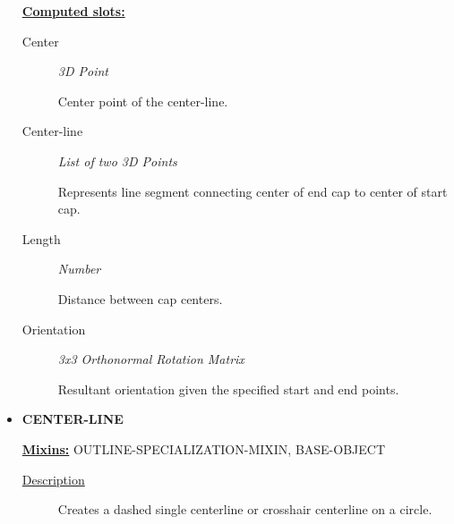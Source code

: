 \documentclass [11pt]{book}
\begin{document}
\begin{itemize}
\textbf{
\underline{Computed slots:}}

\begin{description}

\item [Center]
\emph{3D Point}

 Center point of the center-line.




\item [Center-line]
\emph{List of two 3D Points}

 Represents line segment connecting center of end cap to center of start cap.




\item [Length]
\emph{Number}

 Distance between cap centers.




\item [Orientation]
\emph{3x3 Orthonormal Rotation Matrix}

 Resultant orientation given the specified start and end points.




\end{description}







\item {}
\label{prim:center-line}
\textbf{CENTER-LINE}


\textbf{
\underline{Mixins:}} OUTLINE-SPECIALIZATION-MIXIN, BASE-OBJECT





\begin{description}

\item [
\underline{Description}]


Creates a dashed single centerline or crosshair centerline on a circle.



\end{description}




\begin{figure}
\begin{lrbox}{\boxedverb}
\begin{minipage}{\linewidth}
{\small

}
\end{minipage}
\end{lrbox}
\end{figure}
\end{itemize}
\end{document}
